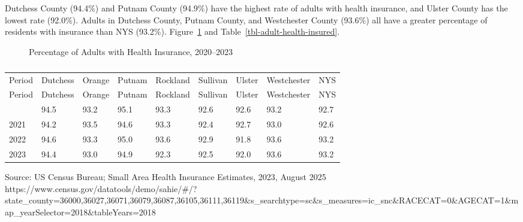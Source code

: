 \documentclass[
  english,
  letterpaper,
]{report}
\begin{document}
Dutchess County (94.4\%) and Putnam County (94.9\%) have the highest
rate of adults with health insurance, and Ulster County has the lowest
rate (92.0\%). Adults in Dutchess County, Putnam County, and Westchester
County (93.6\%) all have a greater percentage of residents with
insurance than NYS (93.2\%). Figure~\ref{fig-adult-health-insured} and
Table~\ref{tbl-adult-health-insured}.

\begin{figure}


\caption{\label{fig-adult-health-insured}Percentage of Adults with
Health Insurance, 2020--2023}

\end{figure}%

\begin{longtable}[]{@{}lllllllll@{}}

\caption{\label{tbl-adult-health-insured}Percentage of Adults with
Health Insurance, 2020--2023}

\tabularnewline

\caption{}\label{T_6af18}\tabularnewline
\toprule\noalign{}
Period & Dutchess & Orange & Putnam & Rockland & Sullivan & Ulster &
Westchester & NYS \\
\midrule\noalign{}
\endfirsthead
\toprule\noalign{}
Period & Dutchess & Orange & Putnam & Rockland & Sullivan & Ulster &
Westchester & NYS \\
\midrule\noalign{}
\endhead
\bottomrule\noalign{}
\endlastfoot
2020 & 94.5 & 93.2 & 95.1 & 93.3 & 92.6 & 92.6 & 93.2 & 92.7 \\
2021 & 94.2 & 93.5 & 94.6 & 93.3 & 92.4 & 92.7 & 93.0 & 92.6 \\
2022 & 94.6 & 93.3 & 95.0 & 93.6 & 92.9 & 91.8 & 93.6 & 93.2 \\
2023 & 94.4 & 93.0 & 94.9 & 92.3 & 92.5 & 92.0 & 93.6 & 93.2 \\

\end{longtable}

\begin{tcolorbox}[enhanced jigsaw, breakable, leftrule=.75mm, title=\textcolor{quarto-callout-note-color}{\faInfo}\hspace{0.5em}{Source}, bottomrule=.15mm, opacityback=0, left=2mm, colback=white, bottomtitle=1mm, coltitle=black, colbacktitle=quarto-callout-note-color!10!white, colframe=quarto-callout-note-color-frame, opacitybacktitle=0.6, toptitle=1mm, titlerule=0mm, arc=.35mm, rightrule=.15mm, toprule=.15mm]

Source: US Census Bureau; Small Area Health Insurance Estimates, 2023,
August 2025
https://www.census.gov/datatools/demo/sahie/\#/?state\_county=36000,36027,36071,36079,36087,36105,36111,36119\&s\_searchtype=sc\&s\_measures=ic\_snc\&RACECAT=0\&AGECAT=1\&map\_yearSelector=2018\&tableYears=2018

\end{tcolorbox}
\end{document}
